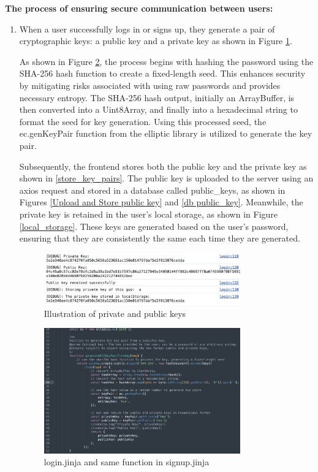 \documentclass[12pt]{article}
\begin{document}
        \textbf{The process of ensuring secure communication between users:}
        \begin{enumerate}
            \item When a user successfully logs in or signs up, they generate a pair of cryptographic keys: a public key and a private key as shown in Figure \ref{show_keys}.

            As shown in Figure \ref{generate_key_pairs}, the process begins with hashing the password using the SHA-256 hash function to create a fixed-length seed. This enhances security by mitigating risks associated with using raw passwords and provides necessary entropy. The SHA-256 hash output, initially an ArrayBuffer, is then converted into a Uint8Array, and finally into a hexadecimal string to format the seed for key generation. Using this processed seed, the ec.genKeyPair function from the elliptic library is utilized to generate the  key pair.
            
            Subsequently, the frontend stores both the public key and the private key as shown in \ref{store_key_pairs}. The public key is uploaded to the server using an axios request and stored in a database called public\_keys, as shown in Figures \ref{Upload and Store public key} and \ref{db public_key}. Meanwhile, the private key is retained in the user's local storage, as shown in Figure \ref{local_storage}. These keys are generated based on the user's password, ensuring that they are consistently the same each time they are generated.

            \begin{figure}[H]
                \centering
                \includegraphics[width=0.8\textwidth]{graphs/show_keys.jpg}
                \caption{Illustration of private and public keys}
                \label{show_keys}
            \end{figure}

            \begin{figure}[H]
                \centering{}
                \includegraphics[width=0.8\textwidth]{graphs/generate_key_pairs.jpg}
                \caption{login.jinja and same function in signup.jinja }
                \label{generate_key_pairs}
            \end{figure}


\end{enumerate}
\end{document}

